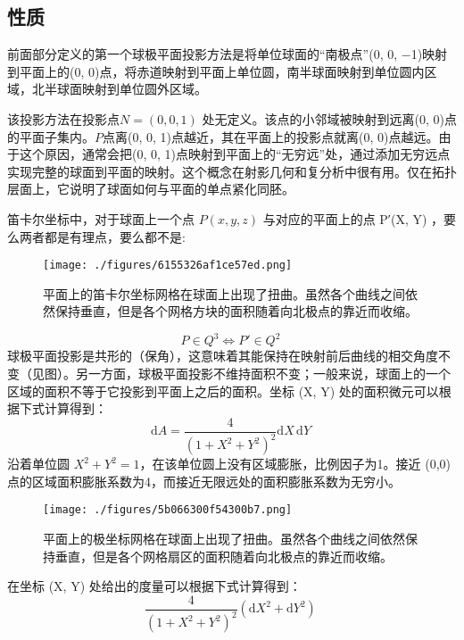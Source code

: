 \subsection{性质}
前面部分定义的第一个球极平面投影方法是将单位球面的“南极点”(0, 0, −1)映射到平面上的(0, 0)点，将赤道映射到平面上单位圆，南半球面映射到单位圆内区域，北半球面映射到单位圆外区域。

该投影方法在投影点$N = (0, 0, 1)$ 处无定义。该点的小邻域被映射到远离(0, 0)点的平面子集内。$P$点离(0, 0, 1)点越近，其在平面上的投影点就离(0, 0)点越远。由于这个原因，通常会把(0, 0, 1)点映射到平面上的“无穷远”处，通过添加无穷远点实现完整的球面到平面的映射。这个概念在射影几何和复分析中很有用。仅在拓扑层面上，它说明了球面如何与平面的单点紧化同胚。

笛卡尔坐标中，对于球面上一个点 $P(x, y, z)$ 与对应的平面上的点 P′(X, Y) ，要么两者都是有理点，要么都不是:
\begin{figure}[ht]
\centering
\texttt{[image: ./figures/6155326af1ce57ed.png]}
\caption{平面上的笛卡尔坐标网格在球面上出现了扭曲。虽然各个曲线之间依然保持垂直，但是各个网格方块的面积随着向北极点的靠近而收缩。} \label{fig_QJPMTY_6}
\end{figure}
$$P \in Q^3 \Longleftrightarrow P' \in Q^2~$$
球极平面投影是共形的（保角），这意味着其能保持在映射前后曲线的相交角度不变（见图）。另一方面，球极平面投影不维持面积不变；一般来说，球面上的一个区域的面积不等于它投影到平面上之后的面积。坐标 (X, Y) 处的面积微元可以根据下式计算得到：
$$\mathrm{d}A = \frac{4}{(1 + X^2 + Y^2)^2} \mathrm{d}X \, \mathrm{d}Y~$$
沿着单位圆 \(X^2 + Y^2 = 1\)，在该单位圆上没有区域膨胀，比例因子为1。接近 (0,0) 点的区域面积膨胀系数为4，而接近无限远处的面积膨胀系数为无穷小。
\begin{figure}[ht]
\centering
\texttt{[image: ./figures/5b066300f54300b7.png]}
\caption{平面上的极坐标网格在球面上出现了扭曲。虽然各个曲线之间依然保持垂直，但是各个网格扇区的面积随着向北极点的靠近而收缩。} \label{fig_QJPMTY_7}
\end{figure}
在坐标 (X, Y) 处给出的度量可以根据下式计算得到：
$$\frac{4}{(1 + X^2 + Y^2)^2} (\mathrm{d}X^2 + \mathrm{d}Y^2)~$$